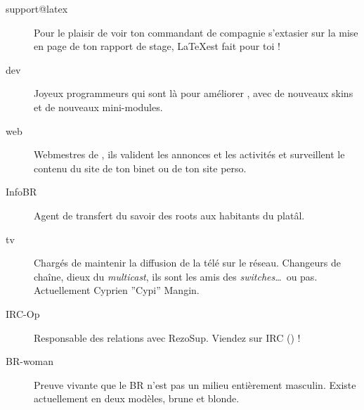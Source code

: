 \begin{description}
  \item[support@latex] {Pour le plaisir de voir ton commandant de compagnie s'extasier sur la mise en page de ton rapport de stage, \LaTeX est fait pour toi !}

  \item[dev]{Joyeux programmeurs qui sont l\`a pour am\'eliorer \fkz, avec de nouveaux skins et de nouveaux mini-modules.}


  \item[web] {Webmestres de \fkz, ils valident les annonces et les activit\'es et surveillent le contenu du site de ton binet ou de ton site perso.}


  \item[InfoBR]{Agent de transfert du savoir des roots aux habitants du plat\^al.}

  \item[tv]{Charg\'es de maintenir la diffusion de la t\'el\'e sur le r\'eseau. Changeurs de cha\^ine, dieux du \emph{multicast},
  ils sont les amis des \emph{switches}\dots\ ou pas. Actuellement Cyprien ''Cypi'' Mangin.}


  \item[IRC-Op]{Responsable des relations avec RezoSup. Viendez sur IRC () !}


  \item[BR-woman]{Preuve vivante que le BR n'est pas un milieu enti\`erement masculin. Existe actuellement en deux modèles, brune et blonde.}

\end{description}

